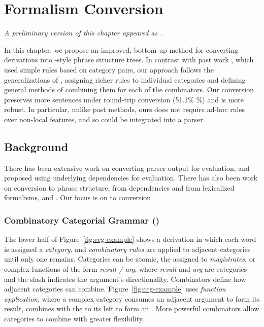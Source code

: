 \newcommand{\old}{\candc{}-Conv\xspace}

\chapter{Formalism Conversion} \label{chp:conversion}

\begin{center}
\textit{
  A preliminary version of this chapter appeared as \textcite{Kummerfeld-etal:2012:ACL}.
}
\end{center}

In this chapter, we propose an improved, bottom-up method for converting \ccg derivations into \ptb-style phrase structure trees.
In contrast with past work \parencite{Clark-Curran:2009}, which used simple rules based on category pairs, our approach follows the generalizations of \ccg, assigning richer rules to individual categories and defining general methods of combining them for each of the \ccg combinators.
Our conversion preserves more sentences under round-trip conversion (51.1\% \%) and is more robust.
In particular, unlike past methods, ours does not require ad-hoc rules over non-local features, and so could be integrated into a parser.

\section{Background}

There has been extensive work on converting parser output for evaluation, \myeg
\textcite{Lin:1998} and \textcite{Briscoe-Carroll-Graham-Copestake:2002} proposed
using underlying dependencies for evaluation.  There has also been work on
conversion to phrase structure, from dependencies \parencite{Xia:2001,Xia:2009} and
from lexicalized formalisms, \myeg \hpsg \parencite{Matsuzaki-Tsujii:2008} and \mytag
\parencite{Chiang:2000,Sarkar:2001}. Our focus is on \ccg to \ptb conversion
\parencite{Clark-Curran:2009}.

\subsection{Combinatory Categorial Grammar (\ccg)}

The lower half of Figure~\ref{fig:ccg-example} shows a \ccg derivation
\parencite{Steedman:2000} in which each word is assigned a {\em category}, and
{\em combinatory rules} are applied to adjacent categories until only one
remains.  Categories can be atomic, \myeg the  assigned to
\textit{magistrates}, or complex functions of the form {\em result / arg}, where
{\em result} and {\em arg} are categories and the slash indicates the argument's
directionality.  Combinators define how adjacent categories can combine.
Figure~\ref{fig:ccg-example} uses {\em function application}, where a complex
category consumes an adjacent argument to form its result, \myeg {} combines with the  to its left to form an .  More
powerful combinators allow categories to combine with greater flexibility.


